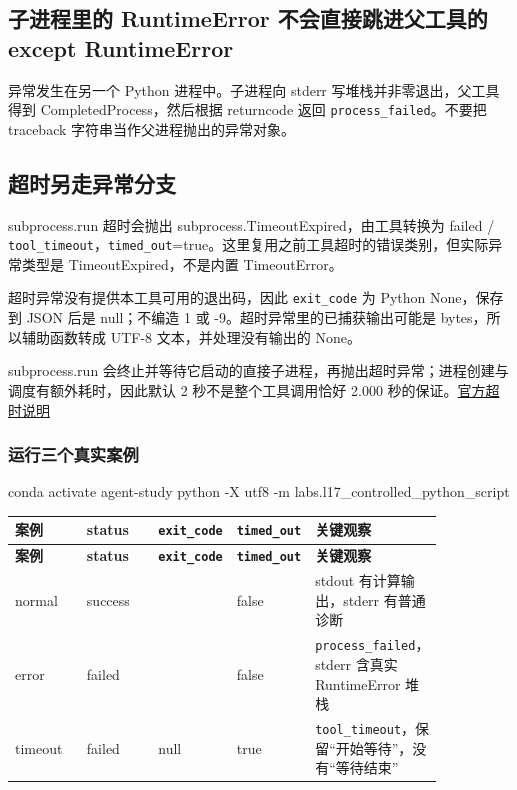 \subsection{子进程里的 RuntimeError 不会直接跳进父工具的 except RuntimeError}

异常发生在另一个 Python 进程中。子进程向 stderr 写堆栈并非零退出，父工具得到 CompletedProcess，然后根据 returncode 返回 \nolinkurl{process_failed}。不要把 traceback 字符串当作父进程抛出的异常对象。

\subsection{超时另走异常分支}

subprocess.run 超时会抛出 subprocess.TimeoutExpired，由工具转换为 failed / \nolinkurl{tool_timeout}，\nolinkurl{timed_out}=true。这里复用之前工具超时的错误类别，但实际异常类型是 TimeoutExpired，不是内置 TimeoutError。

超时异常没有提供本工具可用的退出码，因此 \nolinkurl{exit_code} 为 Python None，保存到 JSON 后是 null；不编造 1 或 -9。超时异常里的已捕获输出可能是 bytes，所以辅助函数转成 UTF-8 文本，并处理没有输出的 None。

subprocess.run 会终止并等待它启动的直接子进程，再抛出超时异常；进程创建与调度有额外耗时，因此默认 2 秒不是整个工具调用恰好 2.000 秒的保证。\href{https://docs.python.org/3.11/library/subprocess.html\#subprocess.run}{官方超时说明}

\subsubsection{运行三个真实案例}

\begin{Code}
conda activate agent-study
python -X utf8 -m labs.l17_controlled_python_script
\end{Code}

{\small\setlength{\tabcolsep}{4pt}
\renewcommand{\arraystretch}{1.25}
\begin{longtable}{>{\raggedright\arraybackslash}p{0.16999999999999998\linewidth}>{\raggedright\arraybackslash}p{0.16999999999999998\linewidth}>{\raggedright\arraybackslash}p{0.16999999999999998\linewidth}>{\raggedright\arraybackslash}p{0.16999999999999998\linewidth}>{\raggedright\arraybackslash}p{0.16999999999999998\linewidth}}
\toprule
\textbf{案例} & \textbf{status} & \textbf{\nolinkurl{exit_code}} & \textbf{\nolinkurl{timed_out}} & \textbf{关键观察} \\
\midrule\endfirsthead
\toprule
\textbf{案例} & \textbf{status} & \textbf{\nolinkurl{exit_code}} & \textbf{\nolinkurl{timed_out}} & \textbf{关键观察} \\
\midrule\endhead
\bottomrule\endfoot
normal & success & 0 & false & stdout 有计算输出，stderr 有普通诊断 \\
error & failed & 1 & false & \nolinkurl{process_failed}，stderr 含真实 RuntimeError 堆栈 \\
timeout & failed & null & true & \nolinkurl{tool_timeout}，保留“开始等待”，没有“等待结束” \\
\end{longtable}}

